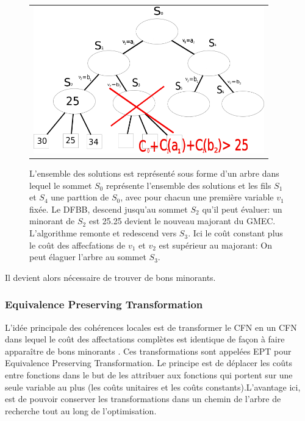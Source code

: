 \begin{figure}[!htbp]
  \centering
  \begin{tabular}{c}
    \includegraphics[width=10cm]{figure/DFBB.png} \\
  \end{tabular}
  \caption{ L'ensemble des solutions est représenté sous forme d'un arbre dans lequel le sommet $S_0$ représente l'ensemble des solutions et les fils $S_1$ et $S_4$ une parttion de $S_0$, avec pour chacun une première variable $v_1$ fixée. Le DFBB, descend jusqu'au sommet $S_2$ qu'il peut évaluer: un minorant de $S_2$ est 25.25 devient le nouveau majorant du GMEC. L'algorithme remonte et redescend vers $S_3$. Ici le coût constant plus le coût des affecfations de $v_1$ et $v_2$ est supérieur au majorant: On peut élaguer l'arbre au sommet $S_3$.}
  \label{fig:DFBB}
\end{figure}



Il devient alors nécessaire de trouver de bons minorants.

\subsubsection{Equivalence Preserving Transformation}

L'idée principale des cohérences locales est de transformer le CFN en un CFN dans lequel le coût des affectations complètes est identique de façon à faire apparaître de bons minorants \cite{Schiex00}. Ces transformations sont appelées EPT pour \og Equivalence Preserving Transformation\fg.  Le principe est de déplacer les coûts entre fonctions dans le but de les attribuer aux fonctions qui portent sur une seule variable au plus (les coûts unitaires et les coûts constants).L'avantage ici, est de pouvoir conserver les transformations dans un chemin de l'arbre de recherche tout au long de l'optimisation.

